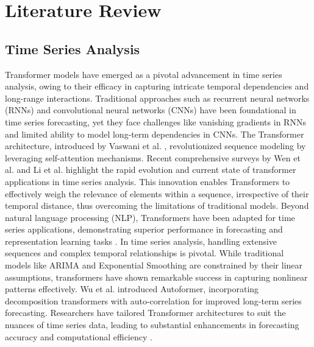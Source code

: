 \section{Literature Review}
\subsection{Time Series Analysis}
Transformer models have emerged as a pivotal advancement in time series analysis, owing to their efficacy in capturing intricate temporal dependencies and long-range interactions. Traditional approaches such as recurrent neural networks (RNNs) \cite{hochreiter1997long} and convolutional neural networks (CNNs) \cite{lecun1995convolutional} have been foundational in time series forecasting, yet they face challenges like vanishing gradients in RNNs and limited ability to model long-term dependencies in CNNs. The Transformer architecture, introduced by Vaswani et al. \cite{vaswani2017attention}, revolutionized sequence modeling by leveraging self-attention mechanisms. Recent comprehensive surveys by Wen et al. \cite{wen2023transformers} and Li et al. \cite{li2023time} highlight the rapid evolution and current state of transformer applications in time series analysis.
This innovation enables Transformers to effectively weigh the relevance of elements within a sequence, irrespective of their temporal distance, thus overcoming the limitations of traditional models. Beyond natural language processing (NLP), Transformers have been adapted for time series applications, demonstrating superior performance in forecasting and representation learning tasks \cite{lim2021temporal, zhou2021informer}. In time series analysis, handling extensive sequences and complex temporal relationships is pivotal. While traditional models like ARIMA \cite{box2015time} and Exponential Smoothing \cite{hyndman2018forecasting} are constrained by their linear assumptions, transformers have shown remarkable success in capturing nonlinear patterns effectively. Wu et al. \cite{wu2021autoformer} introduced Autoformer, incorporating decomposition transformers with auto-correlation for improved long-term series forecasting. Researchers have tailored Transformer architectures to suit the nuances of time series data, leading to substantial enhancements in forecasting accuracy and computational efficiency \cite{zerveas2021transformer}.

